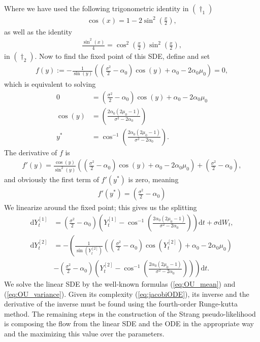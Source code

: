 Where we have used the following trigonometric identity in $(\dagger_1)$
\begin{align*}
    \cos(x) = 1 - 2 \sin^2\left(\frac{x}{2}\right),
\end{align*}
as well as the identity
\begin{align*}
    \frac{\sin^2(x)}{4} = \cos^2\left(\frac{x}{2}\right)\sin^2\left(\frac{x}{2}\right),
\end{align*}
in $(\dagger_2)$. Now to find the fixed point of this SDE, define and set
\begin{align}
    f(y) := -\frac{1}{\sin\left(y\right)}\left(\left(\frac{\sigma^2}{2}-\alpha_0\right)\cos(y) + \alpha_0 - 2\alpha_0\mu_0\right) = 0,
\end{align}
which is equivalent to solving
\begin{align}
    0 &= \left(\frac{\sigma^2}{2}-\alpha_0\right)\cos(y) + \alpha_0 - 2\alpha_0\mu_0 \nonumber\\
    \cos(y) &= \left(\frac{2\alpha_0\left(2\mu_0 - 1\right)}{\sigma^2 - 2\alpha_0}\right) \nonumber\\
    y^* &= \cos^{-1}\left(\frac{2\alpha_0\left(2\mu_0 - 1\right)}{\sigma^2 - 2\alpha_0}\right).
\end{align}
The derivative of $f$ is
\begin{align}
    f'(y) = \frac{\cos(y)}{\sin^2\left(y\right)}\left(\left(\frac{\sigma^2}{2}-\alpha_0\right)\cos(y) + \alpha_0 - 2\alpha_0\mu_0\right) + \left(\frac{\sigma^2}{2}-\alpha_0\right),
\end{align}
and obviously the first term of $f'(y^*)$ is zero, meaning
\begin{align}
    f'(y^*) = \left(\frac{\sigma^2}{2}-\alpha_0\right)
\end{align}
We linearize around the fixed point; this gives us the splitting
\begin{align}
    \mathrm{d}Y_t^{[1]} &= \left(\frac{\sigma^2}{2} - \alpha_0\right)\left(Y_t^{[1]} - \cos^{-1}\left(\frac{2\alpha_0\left(2\mu_0 - 1\right)}{\sigma^2 - 2\alpha_0}\right)\right)\mathrm{d}t + \sigma \mathrm{d}W_t,\\
    \mathrm{d}Y_t^{[2]} &= -\left(\frac{1}{\sin\left(Y_t^{[2]}\right)}\left(\left(\frac{\sigma^2}{2}-\alpha_0\right)\cos(Y_t^{[2]}) + \alpha_0 - 2\alpha_0\mu_0\right) \right. \nonumber \\
    &- \left. \left(\frac{\sigma^2}{2} - \alpha_0\right)\left(Y_t^{[2]} - \cos^{-1}\left(\frac{2\alpha_0\left(2\mu_0 - 1\right)}{\sigma^2 - 2\alpha_0}\right)\right) \right)\mathrm{d}t. \label{eq:jacobiODE}
\end{align}
We solve the linear SDE by the well-known formulas (\ref{eq:OU_mean}) and (\ref{eq:OU_variance}). Given its complexity (\ref{eq:jacobiODE}), its inverse and the derivative of the inverse must be found using the fourth-order Runge-kutta method. The remaining steps in the construction of the Strang pseudo-likelihood is composing the flow from the linear SDE and the ODE in the appropriate way and the maximizing this value over the parameters.
